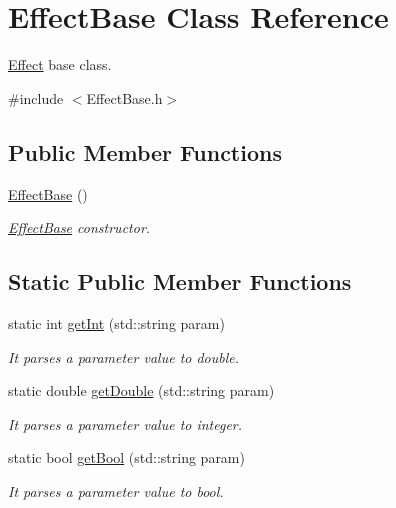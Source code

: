 \hypertarget{class_effect_base}{}\section{Effect\+Base Class Reference}
\label{class_effect_base}


\hyperlink{class_effect}{Effect} base class.  




{\ttfamily \#include $<$Effect\+Base.\+h$>$}

\subsection*{Public Member Functions}
\begin{DoxyCompactItemize}
\item 
\mbox{\label{class_effect_base_afcb5e7c5f5a689d7dc00d30eeefe5045}} 
\hyperlink{class_effect_base_afcb5e7c5f5a689d7dc00d30eeefe5045}{Effect\+Base} ()
\begin{DoxyCompactList}\small\item\em \hyperlink{class_effect_base}{Effect\+Base} constructor. \end{DoxyCompactList}\end{DoxyCompactItemize}
\subsection*{Static Public Member Functions}
\begin{DoxyCompactItemize}
\item 
static int \hyperlink{class_effect_base_aa2c8a7dfd4511cbb41f5ca1afd14cbb5}{get\+Int} (std\+::string param)
\begin{DoxyCompactList}\small\item\em It parses a parameter value to double. \end{DoxyCompactList}\item 
static double \hyperlink{class_effect_base_a29ac04c6135b4a202c0fab169f97f436}{get\+Double} (std\+::string param)
\begin{DoxyCompactList}\small\item\em It parses a parameter value to integer. \end{DoxyCompactList}\item 
static bool \hyperlink{class_effect_base_a5ce32d92ebf6973d177d0f8d1be8e8ba}{get\+Bool} (std\+::string param)
\begin{DoxyCompactList}\small\item\em It parses a parameter value to bool. \end{DoxyCompactList}\end{DoxyCompactItemize}
